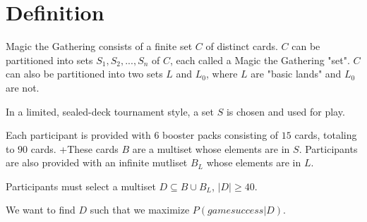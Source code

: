 \documentclass[12pt,letterpaper]{report}
\begin{document}
\section{Definition}

Magic the Gathering consists of a finite set \(C\) of distinct cards.
\(C\) can be partitioned into sets \(S_1, S_2, ..., S_n\) of \(C\), each called a Magic the Gathering "set".
\(C\) can also be partitioned into two sets \(L\) and \(L_0\), where \(L\) are "basic lands" and \(L_0\) are not.

In a limited, sealed-deck tournament style,
a set \(S\) is chosen and used for play.

Each participant is provided with 6 booster packs consisting of \(15\) cards, totaling to \(90\) cards.  +These cards \(B\) are a multiset whose elements are in \(S\).
Participants are also provided with an infinite mutliset \(B_L\) whose elements are in \(L\).

Participants must select a multiset \(D \subseteq B \cup B_L\), \(|D| \ge 40\).

We want to find \(D\) such that we maximize \(P\left(game success | D\right)\).
\end{document}
